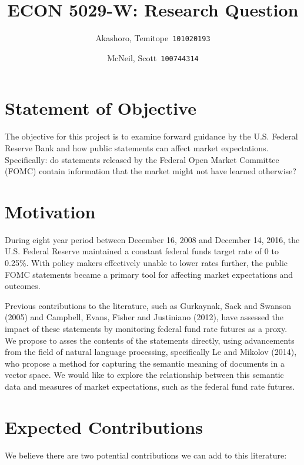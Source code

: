\documentclass{article}\usepackage[]{graphicx}\usepackage[]{color}
\begin{document}

\author{
  Akashoro, Temitope\      \texttt{101020193}
  \and
  McNeil, Scott\      \texttt{100744314}
}

\title{ECON 5029-W: Research Question}

\maketitle

\section{Statement of Objective}

The objective for this project is to examine forward guidance by the U.S. Federal Reserve Bank and how public statements can affect market expectations. Specifically: do statements released by the Federal Open Market Committee (FOMC) contain information that the market might not have learned otherwise?

\section{Motivation}

During eight year period between December 16, 2008 and December 14, 2016, the U.S. Federal Reserve maintained a constant federal funds target rate of 0 to 0.25\%. With policy makers effectively unable to lower rates further, the public FOMC statements became a primary tool for affecting market expectations and outcomes.

Previous contributions to the literature, such as Gurkaynak, Sack and Swanson (2005) and Campbell, Evans, Fisher and Justiniano (2012), have assessed the impact of these statements by monitoring federal fund rate futures as a proxy. We propose to asses the contents of the statements directly, using advancements from the field of natural language processing, specifically Le and Mikolov (2014), who propose a method for capturing the semantic meaning of documents in a vector space. We would like to explore the relationship between this semantic data and measures of market expectations, such as the federal fund rate futures.

\section{Expected Contributions}

We believe there are two potential contributions we can add to this literature:
\end{document}
